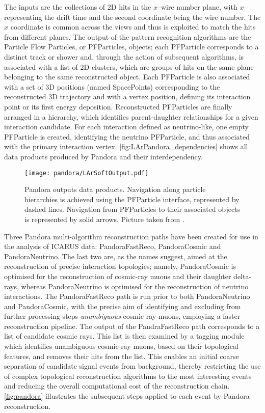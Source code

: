 The inputs are the collections of 2D hits in the $x$--wire number plane, with $x$ representing the drift time and the second coordinate being the wire number. The $x$ coordinate is common across the views and thus is exploited to match the hits from different planes. The output of the pattern recognition algorithms are the Particle Flow Particles, or PFParticles, objects; each PFParticle corresponds to a distinct track or shower and, through the action of subsequent algorithms, is associated with a list of 2D clusters, which are groups of hits on the same plane belonging to the same reconstructed object. Each PFParticle is also associated with a set of 3D positions (named SpacePoints) corresponding to the reconstructed 3D trajectory and with a vertex position, defining its interaction point or its first energy deposition. Reconstructed PFParticles are finally arranged in a hierarchy, which identifies parent-daughter relationships for a given interaction candidate. For each interaction defined as neutrino-like, one empty PFParticle is created, identifying the neutrino PFParticle, and thus associated with the primary interaction vertex. \autoref{fig:LArPandora_dependencies} shows all data products produced by Pandora and their interdependency. 

\begin{figure}
    \centering
    \texttt{[image: pandora/LArSoftOutput.pdf]}
    \caption[LArPandora output data products]{Pandora outputs data products. Navigation along particle hierarchies is achieved using the PFParticle interface, represented by dashed lines. Navigation from PFParticles to their associated objects is represented by solid arrows. Picture taken from \cite{MicroBooNE:2017xvs}. }
    \label{fig:LArPandora_dependencies}
\end{figure}

Three Pandora multi-algorithm reconstruction paths have been created for use in the analysis of ICARUS data: PandoraFastReco, PandoraCosmic and PandoraNeutrino. The last two are, as the names suggest, aimed at the reconstruction of precise interaction topologies; namely,  PandoraCosmic is optimised for the reconstruction of cosmic-ray muons and their daughter delta-rays, whereas PandoraNeutrino is optimised for the reconstruction of neutrino interactions. The PandoraFastReco path is run prior to both PandoraNeutrino and PandoraCosmic, with the precise aim of identifying and excluding from further processing steps \emph{unambiguous} cosmic-ray muons, employing a faster reconstruction pipeline. The output of the PandraFastReco path corresponds to a list of candidate cosmic rays. This list is then examined by a tagging module which identifies unambiguous cosmic-ray muons, based on their topological features, and removes their hits from the list. This enables an initial coarse separation of candidate signal events from background, thereby restricting the use of complex topological reconstruction algorithms to the most interesting events and reducing the overall computational cost of the reconstruction chain. \autoref{fig:pandora} illustrates the subsequent steps applied to each event by Pandora reconstruction. 

